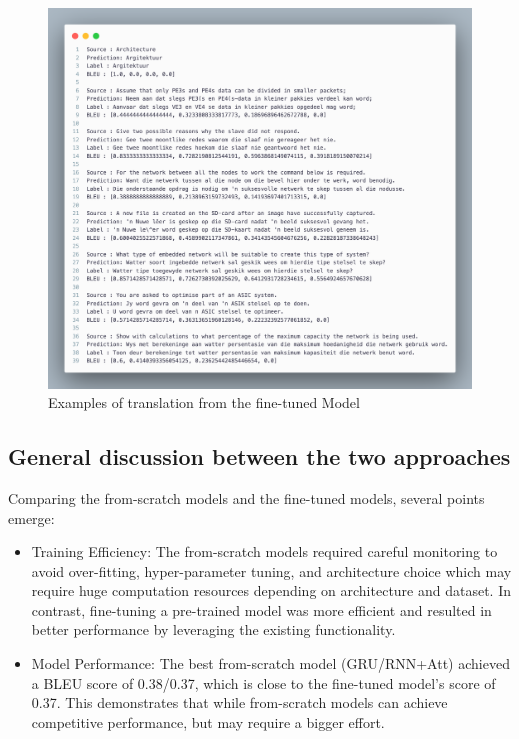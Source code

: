 \begin{figure}[H]
	\centering
	\includegraphics[width=\linewidth]{./figures/example.png}
	\caption{Examples of translation from the fine-tuned Model}
	\label{fig:example}
\end{figure}



\subsection{General discussion between the two approaches}
Comparing the from-scratch models and the fine-tuned models, several points emerge:
\begin{itemize}
	\item Training Efficiency: The from-scratch models required careful monitoring to avoid over-fitting, hyper-parameter tuning, and architecture choice which may require huge computation resources depending on architecture and dataset. In contrast, fine-tuning a pre-trained model was more efficient and resulted in better performance by leveraging the existing functionality.

	\item Model Performance: The best from-scratch model (GRU/RNN+Att) achieved a BLEU score of 0.38/0.37, which is close to the fine-tuned model's score of 0.37. This demonstrates that while from-scratch models can achieve competitive performance, but may require a bigger effort.
\end{itemize}

